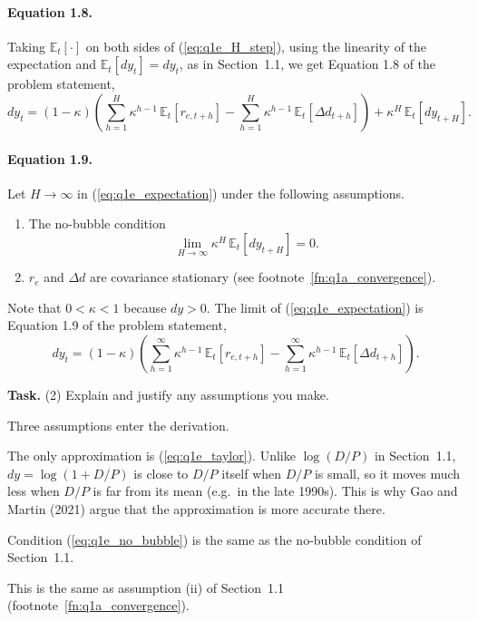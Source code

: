 \documentclass[11pt]{article}
\makeatletter
\newcommand{\E}{\mathbb{E}}
\newcommand{\dy}{\mathit{dy}}
\newcommand{\task}[1]{\par\if@nobreak\else\needspace{5\baselineskip}\fi\medskip\noindent
  \begin{minipage}{\linewidth}\textbf{Task.} #1\end{minipage}\par   %
  \nopagebreak\medskip\@afterheading}   %
\makeatother
\begin{document}
\paragraph{Equation 1.8.}
Taking $\E_t[\cdot]$ on both sides of (\ref{eq:q1e_H_step}), using the linearity of the
expectation and $\E_t[\dy_t] = \dy_t$, as in Section~1.1, we get Equation 1.8 of the
problem statement,
\begin{equation}
  \dy_t = (1 - \kappa) \left( \sum_{h=1}^{H} \kappa^{h-1}\, \E_t[r_{e,t+h}]
          - \sum_{h=1}^{H} \kappa^{h-1}\, \E_t[\Delta d_{t+h}] \right)
          + \kappa^{H}\, \E_t[\dy_{t+H}].
  \label{eq:q1e_expectation}
\end{equation}

\paragraph{Equation 1.9.}
Let $H \to \infty$ in (\ref{eq:q1e_expectation}) under the following assumptions.
\begin{enumerate}[label=(\roman*)]
  \item The no-bubble condition
    \begin{equation}
      \lim_{H \to \infty} \kappa^{H}\, \E_t[\dy_{t+H}] = 0.
      \label{eq:q1e_no_bubble}
    \end{equation}
  \item $r_e$ and $\Delta d$ are covariance stationary (see
    footnote~\ref{fn:q1a_convergence}).
\end{enumerate}
Note that $0 < \kappa < 1$ because $\dy > 0$. The limit of (\ref{eq:q1e_expectation}) is
Equation 1.9 of the problem statement,
\begin{equation}
  \dy_t = (1 - \kappa) \left( \sum_{h=1}^{\infty} \kappa^{h-1}\, \E_t[r_{e,t+h}]
          - \sum_{h=1}^{\infty} \kappa^{h-1}\, \E_t[\Delta d_{t+h}] \right).
  \label{eq:q1e_infinite}
\end{equation}

\task{(2) Explain and justify any assumptions you make.}

\noindent Three assumptions enter the derivation.
\begin{description}[leftmargin=1.5em, labelindent=0em, itemsep=0.4em]
  \item[Log-linearization.] The only approximation is (\ref{eq:q1e_taylor}). Unlike
    $\log(D/P)$ in Section~1.1, $\dy = \log(1 + D/P)$ is close to $D/P$ itself when $D/P$ is
    small, so it moves much less when $D/P$ is far from its mean (e.g.\ in the late 1990s).
    This is why Gao and Martin (2021) argue that the approximation is more accurate there.
  \item[No bubble (i).] Condition (\ref{eq:q1e_no_bubble}) is the same as the no-bubble
    condition of Section~1.1.
  \item[Stationarity (ii).] This is the same as assumption (ii) of Section~1.1
    (footnote~\ref{fn:q1a_convergence}).
\end{description}
\end{document}
